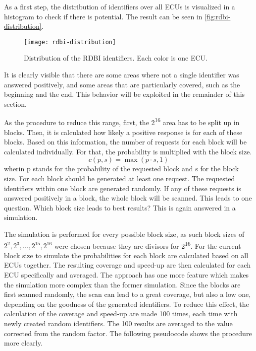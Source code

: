 As a first step, the distribution of identifiers over all ECUs is visualized in a histogram to check if there is potential. The result can be seen in \autoref{fig:rdbi-distribution}.

\begin{figure}[h]
    \centering
    \texttt{[image: rdbi-distribution]}
    \caption{Distribution of the RDBI identifiers. Each color is one ECU.}
    \label{fig:rdbi-distribution}
\end{figure}

It is clearly visible that there are some areas where not a single identifier was answered positively, and some areas that are particularly covered, such as the beginning and the end. This behavior will be exploited in the remainder of this section.

As the procedure to reduce this range, first, the 2\textsuperscript{16} area has to be split up in blocks. Then, it is calculated how likely a positive response is for each of these blocks. Based on this information, the number of requests for each block will be calculated individually. For that, the probability is multiplied with the block size.
\[c(p, s)=\max(p \cdot s, 1)\]
wherin p stands for the probability of the requested block and s for the block size. For each block should be generated at least one request. The requested identifiers within one block are generated randomly. If any of these requests is answered positively in a block, the whole block will be scanned.
This leads to one question. Which block size leads to best results? This is again answered in a simulation.

The simulation is performed for every possible block size, as such block sizes of $2^2, 2^3, ..., 2^{15}, 2^{16}$ were chosen because they are divisors for 2\textsuperscript{16}. For the current block size to simulate the probabilities for each block are calculated based on all ECUs together. The resulting coverage and speed-up are then calculated for each ECU specifically and averaged. The approach has one more feature which makes the simulation more complex than the former simulation. Since the blocks are first scanned randomly, the scan can lead to a great coverage, but also a low one, depending on the goodness of the generated identifiers. To reduce this effect, the calculation of the coverage and speed-up are made 100 times, each time with newly created random identifiers. The 100 results are averaged to the value corrected from the random factor.
The following pseudocode shows the procedure more clearly.

